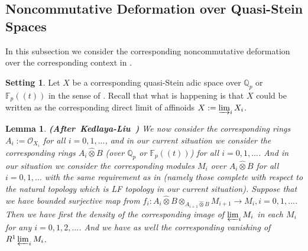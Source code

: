 \documentclass[12pt]{amsart}
\newtheorem{lemma}[theorem]{Lemma}
\theoremstyle{definition}
\numberwithin{equation}{section}
\newtheorem{setting}[theorem]{Setting}
\begin{document}
\subsection{Noncommutative Deformation over Quasi-Stein Spaces}

\indent In this subsection we consider the corresponding noncommutative deformation over the corresponding context in \cite[Chapter 2.6]{KL2}.

\begin{setting}
Let $X$ be a corresponding quasi-Stein adic space over $\mathbb{Q}_p$ or $\mathbb{F}_p((t))$ in the sense of \cite[Definition 2.6.2]{KL2}. Recall that what is happening is that $X$ could be written as the corresponding direct limit of affinoids $X:=\varinjlim_i X_i$. 	
\end{setting}



\begin{lemma} \mbox{\bf{(After Kedlaya-Liu \cite[Lemma 2.6.3]{KL2})}}
We now consider the corresponding rings $A_i:=\mathcal{O}_{X_i}$ for all $i=0,1,...$, and in our current situation we consider the corresponding rings $A_i\widehat{\otimes}B$ (over $\mathbb{Q}_p$ or $\mathbb{F}_p((t))$) for all $i=0,1,...$. And in our situation we consider the corresponding modules $M_i$ over $A_i\widehat{\otimes}B$ for all $i=0,1,...$ with the same requirement as in \cite[Lemma 2.6.3]{KL2} (namely those complete with respect to the natural topology which is LF topology in our current situation). Suppose that we have bounded surjective map from $f_i:A_{i}\widehat{\otimes}B\otimes_{A_{i+1}\widehat{\otimes}B} M_{i+1}\rightarrow M_i,i=0,1,...$. Then we have first the density of the corresponding image of $\varprojlim_i M_i$ in each $M_i$ for any $i=0,1,2,...$. And we have as well the corresponding vanishing of $R^1\varprojlim_i M_i$.
\end{lemma}
\end{document}
